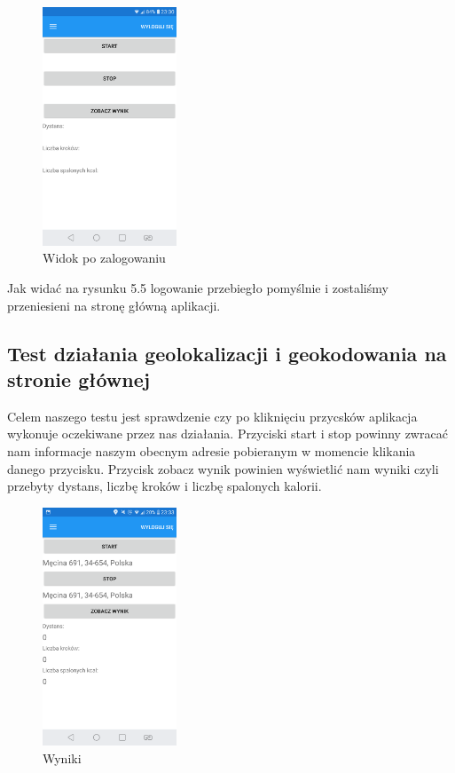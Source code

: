 \begin{figure}[!htb]
	\begin{center}
		\includegraphics[width=4cm]{rys/ZZsg.png}
		\caption{Widok po zalogowaniu}
		\label{rys:rysunek033}
	\end{center}
\end{figure}

Jak widać na rysunku 5.5 logowanie przebiegło pomyślnie i zostaliśmy przeniesieni na stronę główną aplikacji.

\subsection{Test działania geolokalizacji i geokodowania na stronie głównej}

Celem naszego testu jest sprawdzenie czy po kliknięciu przycsków aplikacja wykonuje oczekiwane przez nas działania. Przyciski start i stop powinny zwracać nam informacje naszym obecnym adresie pobieranym w momencie klikania danego przycisku. Przycisk zobacz wynik powinien wyświetlić nam wyniki czyli przebyty dystans, liczbę kroków i liczbę spalonych kalorii.

\begin{figure}[!htb]
	\begin{center}
		\includegraphics[width=4cm]{rys/ZZZ.png}
		\caption{Wyniki}
		\label{rys:rysunek034}
	\end{center}
\end{figure}

